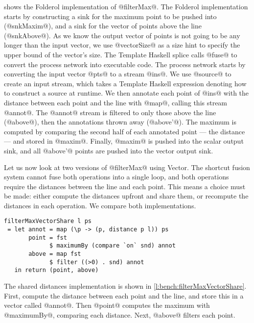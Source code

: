 shows the Folderol implementation of @filterMax@.
The Folderol implementation starts by constructing a sink for the maximum point to be pushed into (@snkMaxim@), and a sink for the vector of points above the line (@snkAbove@).
As we know the output vector of points is not going to be any longer than the input vector, we use @vectorSize@ as a size hint to specify the upper bound of the vector's size.
The Template Haskell splice calls @fuse@ to convert the process network into executable code.
The process network starts by converting the input vector @pts@ to a stream @ins@.
We use @source@ to create an input stream, which takes a Template Haskell expression denoting how to construct a source at runtime.
We then annotate each point of @ins@ with the distance between each point and the line with @map@, calling this stream @annot@.
The @annot@ stream is filtered to only those above the line (@above@), then the annotations thrown away (@above'@).
The maximum is computed by comparing the second half of each annotated point --- the distance --- and stored in @maxim@.
Finally, @maxim@ is pushed into the scalar output sink, and all @above'@ points are pushed into the vector output sink.


Let us now look at two versions of @filterMax@ using Vector.
The shortcut fusion system cannot fuse both operations into a single loop, and both operations require the distances between the line and each point.
This means a choice must be made: either compute the distances upfront and share them, or recompute the distances in each operation.
We compare both implementations.

\begin{lstlisting}[float,label=l:bench:filterMaxVectorShare,caption=Vector / share implementation of filterMax]
filterMaxVectorShare l ps
 = let annot = map (\p -> (p, distance p l)) ps
       point = fst
             $ maximumBy (compare `on` snd) annot
       above = map fst
             $ filter ((>0) . snd) annot
   in return (point, above)
\end{lstlisting}

The shared distances implementation is shown in \cref{l:bench:filterMaxVectorShare}.
First, compute the distance between each point and the line, and store this in a vector called @annot@.
Then @point@ computes the maximum with @maximumBy@, comparing each distance.
Next, @above@ filters each point.


